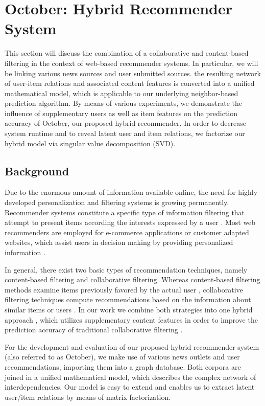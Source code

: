 \documentclass[11pt,letterpaper]{article}
\begin{document}
\newpage


\section{October: Hybrid Recommender System}

This section will discuss the combination of a collaborative and content-based filtering in the context of web-based recommender systems. In particular, we will be linking various news sources and user submitted sources. the resulting network of user-item relations and associated content features is converted into a unified mathematical model, which is applicable to our underlying neighbor-based prediction algorithm. By means of various experiments, we demonstrate the influence of supplementary users as well as item features on the prediction accuracy of October, our proposed hybrid recommender. In order to decrease system runtime and to reveal latent user and item relations, we factorize our hybrid model via singular value decomposition (SVD).\\

\subsection{Background}

Due to the enormous amount of information available online, the need for highly developed personalization and filtering systems is growing permanently. Recommender systems constitute a specific type of information filtering that attempt to present items according the interests expressed by a user \cite{1}. Most web recommenders are employed for e-commerce applications or customer adapted websites, which assist users in decision making by providing personalized information \cite{5}. 

In general, there exist two basic types of recommendation techniques, namely content-based filtering and collaborative filtering. Whereas content-based filtering methods examine items previously favored by the actual user \cite{7}, collaborative filtering techniques compute recommendations based on the information about similar items or users \cite{10}. In our work we combine both strategies into one hybrid approach \cite{3}, which utilizes supplementary content features in order to improve the prediction accuracy of traditional collaborative filtering \cite{6, 11}. 

For the development and evaluation of our proposed hybrid recommender system (also referred to as October), we make use of various news outlets and user recommendations, importing them into a graph database. Both corpora are joined in a unified mathematical model, which describes the complex network of interdependencies. Our model is easy to extend and enables us to extract latent user/item relations by means of matrix factorization.
\end{document}
